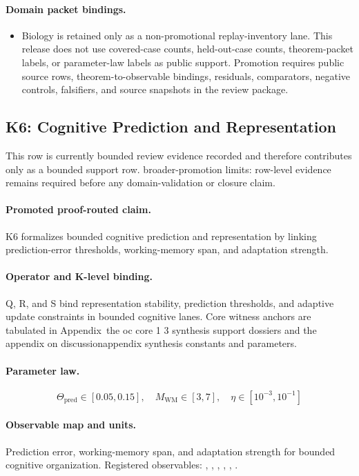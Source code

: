\paragraph{Domain packet bindings.}
\begin{itemize}[leftmargin=1.6em,nosep]
\item Biology is retained only as a non-promotional replay-inventory lane. This release does not use covered-case counts, held-out-case counts, theorem-packet labels, or parameter-law labels as public support. Promotion requires public source rows, theorem-to-observable bindings, residuals, comparators, negative controls, falsifiers, and source snapshots in the review package.
\end{itemize}

\subsection{K6: Cognitive Prediction and Representation}
\label{sec:oc-core-1-3-synthesis-k6}
This row is currently bounded review evidence recorded and therefore contributes only as a bounded support row.
broader-promotion limits: row-level evidence remains required before any domain-validation or closure claim.

\paragraph{Promoted proof-routed claim.}
K6 formalizes bounded cognitive prediction and representation by linking prediction-error thresholds, working-memory span, and adaptation strength.

\paragraph{Operator and K-level binding.}
Q, R, and S bind representation stability, prediction thresholds, and adaptive update constraints in bounded cognitive lanes.
Core witness anchors are tabulated in Appendix~the oc core 1 3 synthesis support dossiers and the appendix on discussionappendix synthesis constants and parameters.

\paragraph{Parameter law.}
\[
\Theta_{\mathrm{pred}} \in [0.05,0.15],\quad M_{\mathrm{WM}} \in [3,7],\quad \eta \in [10^{-3},10^{-1}]
\]

\paragraph{Observable map and units.}
Prediction error, working-memory span, and adaptation strength for bounded cognitive organization.
Registered observables: , \allowbreak {}, \allowbreak {}, \allowbreak {}, \allowbreak {}, \allowbreak {}.

